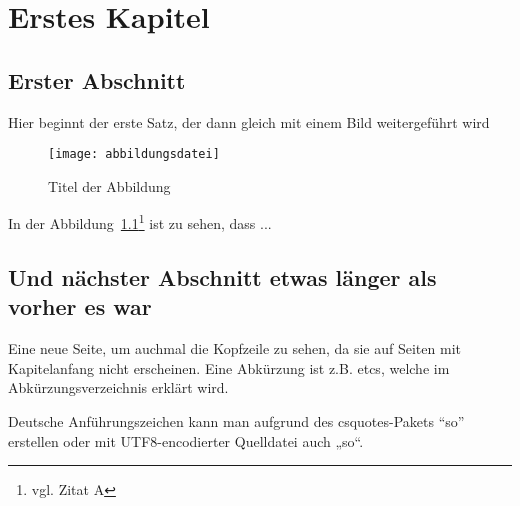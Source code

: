 \chapter{Erstes Kapitel}
\section{Erster Abschnitt}

Hier beginnt der erste Satz, der dann gleich mit einem Bild weitergeführt wird
\begin{figure}[htbp]
\centering
\texttt{[image: abbildungsdatei]} %
\caption{Titel der Abbildung} 
\label{fig:bild1}
\end{figure}

In der Abbildung~\ref{fig:bild1}\footnote{vgl. Zitat A\cite{referenzA}} %
ist zu sehen, dass ...

\newpage

\section{Und nächster Abschnitt etwas länger als vorher es war}
Eine neue Seite, um auchmal die Kopfzeile zu sehen, da sie auf Seiten mit Kapitelanfang nicht erscheinen. Eine Abkürzung ist z.B. \glspl{etc}, welche im 
Abkürzungsverzeichnis erklärt wird. 

Deutsche Anführungszeichen kann man aufgrund des csquotes-Pakets \enquote{so} erstellen oder mit UTF8-encodierter Quelldatei auch „so“.
